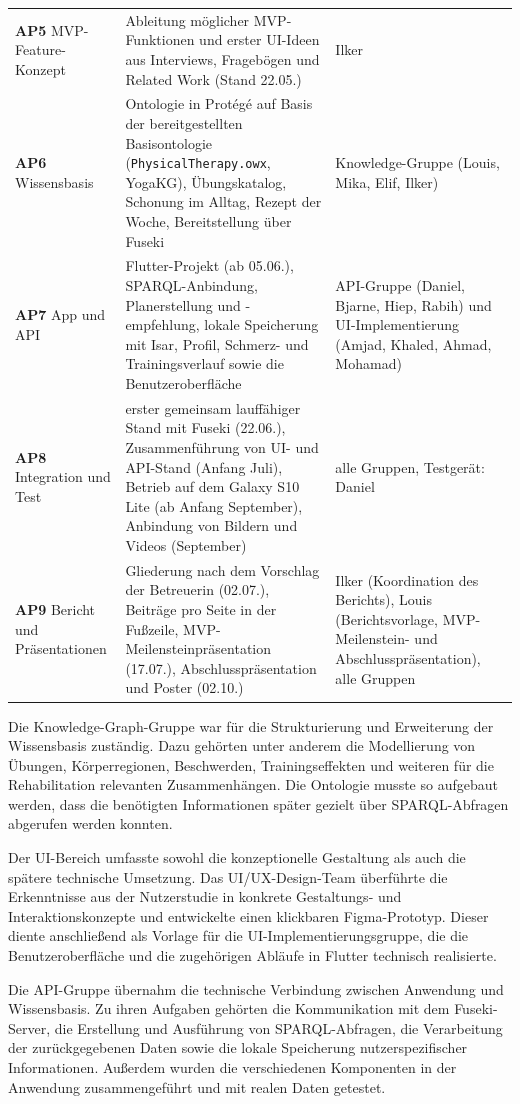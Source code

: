 {\begin{xltabular}{\textwidth}{@{} >{\raggedright\arraybackslash}p{3.4cm} >{\raggedright\arraybackslash}X >{\raggedright\arraybackslash}p{3.9cm} @{}}
    \textbf{AP5} MVP-Feature-Konzept & Ableitung möglicher MVP-Funktionen und erster UI-Ideen aus Interviews, Fragebögen und Related Work (Stand 22.05.) & Ilker \\
    \textbf{AP6} Wissensbasis & Ontologie in Protégé auf Basis der bereitgestellten Basisontologie (\texttt{PhysicalTherapy.owx}, YogaKG), Übungskatalog, Schonung im Alltag, Rezept der Woche, Bereitstellung über Fuseki & Knowledge-Gruppe (Louis, Mika, Elif, Ilker) \\
    \textbf{AP7} App und API & Flutter-Projekt (ab 05.06.), SPARQL-Anbindung, Planerstellung und -empfehlung, lokale Speicherung mit Isar, Profil, Schmerz- und Trainingsverlauf sowie die Benutzeroberfläche & API-Gruppe (Daniel, Bjarne, Hiep, Rabih) und UI-Implementierung (Amjad, Khaled, Ahmad, Mohamad) \\
    \textbf{AP8} Integration und Test & erster gemeinsam lauffähiger Stand mit Fuseki (22.06.), Zusammenführung von UI- und API-Stand (Anfang Juli), Betrieb auf dem Galaxy S10 Lite (ab Anfang September), Anbindung von Bildern und Videos (September) & alle Gruppen, Testgerät: Daniel \\
    \textbf{AP9} Bericht und Präsentationen & Gliederung nach dem Vorschlag der Betreuerin (02.07.), Beiträge pro Seite in der Fußzeile, MVP-Meilensteinpräsentation (17.07.), Abschlusspräsentation und Poster (02.10.) & Ilker (Koordination des Berichts), Louis (Berichtsvorlage, MVP-Meilenstein- und Abschlusspräsentation), alle Gruppen \\
\end{xltabular}
}

Die Knowledge-Graph-Gruppe war für die Strukturierung und Erweiterung der Wissensbasis zuständig. Dazu gehörten unter anderem die Modellierung von Übungen, Körperregionen, Beschwerden, Trainingseffekten und weiteren für die Rehabilitation relevanten Zusammenhängen. Die Ontologie musste so aufgebaut werden, dass die benötigten Informationen später gezielt über SPARQL-Abfragen abgerufen werden konnten.

Der UI-Bereich umfasste sowohl die konzeptionelle Gestaltung als auch die spätere technische Umsetzung. Das UI/UX-Design-Team überführte die Erkenntnisse aus der Nutzerstudie in konkrete Gestaltungs- und Interaktionskonzepte und entwickelte einen klickbaren Figma-Prototyp. Dieser diente anschließend als Vorlage für die UI-Implementierungsgruppe, die die Benutzeroberfläche und die zugehörigen Abläufe in Flutter technisch realisierte.

Die API-Gruppe übernahm die technische Verbindung zwischen Anwendung und Wissensbasis. Zu ihren Aufgaben gehörten die Kommunikation mit dem Fuseki-Server, die Erstellung und Ausführung von SPARQL-Abfragen, die Verarbeitung der zurückgegebenen Daten sowie die lokale Speicherung nutzerspezifischer Informationen. Außerdem wurden die verschiedenen Komponenten in der Anwendung zusammengeführt und mit realen Daten getestet.

